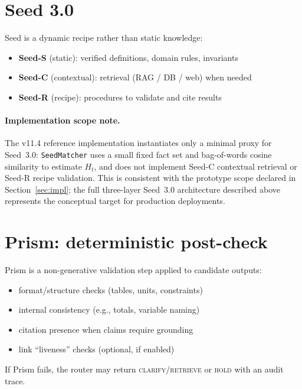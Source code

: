 \documentclass[11pt,a4paper]{article}
\begin{document}
\section{Seed 3.0}
\label{sec:seed}

Seed is a dynamic recipe rather than static knowledge:
\begin{itemize}
\item \textbf{Seed-S} (static): verified definitions, domain rules, invariants
\item \textbf{Seed-C} (contextual): retrieval (RAG / DB / web) when needed
\item \textbf{Seed-R} (recipe): procedures to validate and cite results
\end{itemize}

\paragraph{Implementation scope note.}
The v11.4 reference implementation instantiates only a minimal proxy for Seed~3.0:
\texttt{SeedMatcher} uses a small fixed fact set and bag-of-words cosine similarity
to estimate $H_t$, and does not implement Seed-C contextual retrieval or Seed-R
recipe validation.
This is consistent with the prototype scope declared in Section~\ref{sec:impl};
the full three-layer Seed~3.0 architecture described above represents the
conceptual target for production deployments.

\section{Prism: deterministic post-check}
\label{sec:prism}

Prism is a non-generative validation step applied to candidate outputs:
\begin{itemize}
\item format/structure checks (tables, units, constraints)
\item internal consistency (e.g., totals, variable naming)
\item citation presence when claims require grounding
\item link ``liveness'' checks (optional, if enabled)
\end{itemize}
If Prism fails, the router may return \textsc{clarify}/\textsc{retrieve} or
\textsc{hold} with an audit trace.
\end{document}

